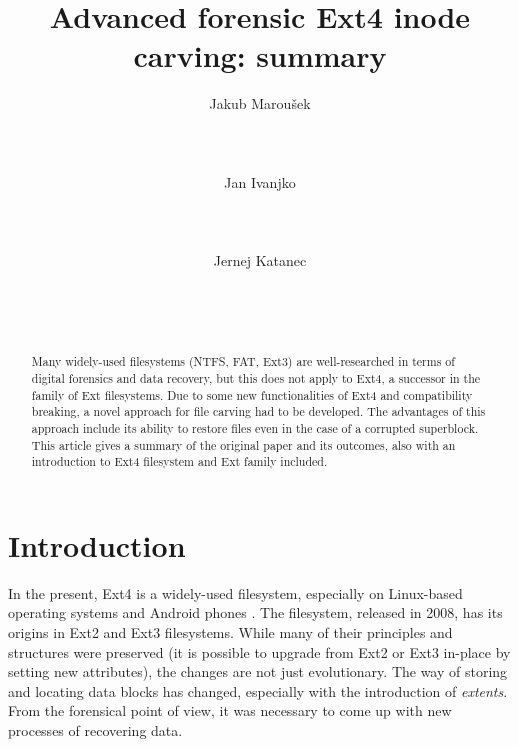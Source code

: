 \documentclass{acm_proc_article-sp}
\begin{document}
\title{Advanced forensic Ext4 inode carving: summary}

\author{
\alignauthor Jakub Marou\v sek \\
	\\
    \\
    \\
\alignauthor Jan Ivanjko \\
	\\
    \\
    \\
\alignauthor Jernej Katanec \\
	\\
    \\
    \\
}

\maketitle
\begin{abstract}
Many widely-used filesystems (NTFS, FAT, Ext3) are well-researched in terms of digital forensics and data recovery, but this does not apply to Ext4, a successor in the family of Ext filesystems. Due to some new functionalities of Ext4 and compatibility breaking, a novel approach for file carving had to be developed. The advantages of this approach include its ability to restore files even in the case of a corrupted superblock. This article gives a summary of the original paper and its outcomes, also with an introduction to Ext4 filesystem and Ext family included.
\end{abstract}

\section{Introduction}

In the present, Ext4 is a widely-used filesystem, especially on Linux-based operating systems and Android phones \cite{afeic}. The filesystem, released in 2008, has its origins in Ext2 and Ext3 filesystems. While many of their principles and structures were preserved (it is possible to upgrade from Ext2 or Ext3 in-place by setting new attributes), the changes are not just evolutionary. The way of storing and locating data blocks has changed, especially with the introduction of {\it extents}. From the forensical point of view, it was necessary to come up with new processes of recovering data.
\end{document}
